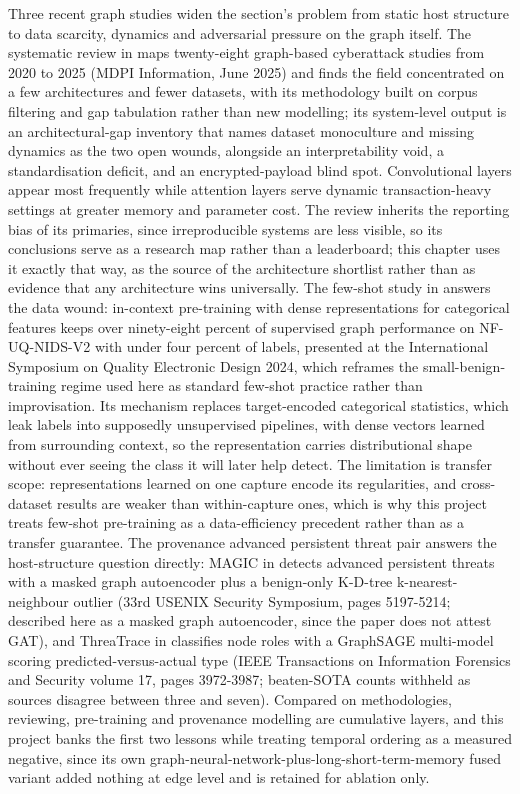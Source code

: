 Three recent graph studies widen the section's problem from static host structure to data scarcity, dynamics and adversarial pressure on the graph itself. The systematic review in \cite{k24} maps twenty-eight graph-based cyberattack studies from 2020 to 2025 (MDPI Information, June 2025) and finds the field concentrated on a few architectures and fewer datasets, with its methodology built on corpus filtering and gap tabulation rather than new modelling; its system-level output is an architectural-gap inventory that names dataset monoculture and missing dynamics as the two open wounds, alongside an interpretability void, a standardisation deficit, and an encrypted-payload blind spot. Convolutional layers appear most frequently while attention layers serve dynamic transaction-heavy settings at greater memory and parameter cost. The review inherits the reporting bias of its primaries, since irreproducible systems are less visible, so its conclusions serve as a research map rather than a leaderboard; this chapter uses it exactly that way, as the source of the architecture shortlist rather than as evidence that any architecture wins universally. The few-shot study in \cite{k20} answers the data wound: in-context pre-training with dense representations for categorical features keeps over ninety-eight percent of supervised graph performance on NF-UQ-NIDS-V2 with under four percent of labels, presented at the International Symposium on Quality Electronic Design 2024, which reframes the small-benign-training regime used here as standard few-shot practice rather than improvisation. Its mechanism replaces target-encoded categorical statistics, which leak labels into supposedly unsupervised pipelines, with dense vectors learned from surrounding context, so the representation carries distributional shape without ever seeing the class it will later help detect. The limitation is transfer scope: representations learned on one capture encode its regularities, and cross-dataset results are weaker than within-capture ones, which is why this project treats few-shot pre-training as a data-efficiency precedent rather than as a transfer guarantee. The provenance advanced persistent threat pair answers the host-structure question directly: MAGIC in \cite{k21} detects advanced persistent threats with a masked graph autoencoder plus a benign-only K-D-tree k-nearest-neighbour outlier (33rd USENIX Security Symposium, pages 5197-5214; described here as a masked graph autoencoder, since the paper does not attest GAT), and ThreaTrace in \cite{k22} classifies node roles with a GraphSAGE multi-model scoring predicted-versus-actual type (IEEE Transactions on Information Forensics and Security volume 17, pages 3972-3987; beaten-SOTA counts withheld as sources disagree between three and seven). Compared on methodologies, reviewing, pre-training and provenance modelling are cumulative layers, and this project banks the first two lessons while treating temporal ordering as a measured negative, since its own graph-neural-network-plus-long-short-term-memory fused variant added nothing at edge level and is retained for ablation only.


